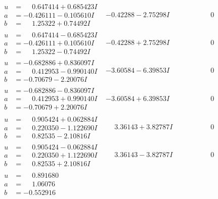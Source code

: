 \documentclass[1p]{elsarticle_modified}
\theoremstyle{definition}
\begin{document}
$$\begin{array}{c|c|c}
\begin{aligned}
u &= \phantom{-}0.647414 + 0.685423 I \\
a &= -0.426111 - 0.105610 I \\
b &= \phantom{-}1.25322 + 0.74492 I\end{aligned}
 & -0.42288 - 2.75298 I & \phantom{-0.000000 } 0 \\ \hline\begin{aligned}
u &= \phantom{-}0.647414 - 0.685423 I \\
a &= -0.426111 + 0.105610 I \\
b &= \phantom{-}1.25322 - 0.74492 I\end{aligned}
 & -0.42288 + 2.75298 I & \phantom{-0.000000 } 0 \\ \hline\begin{aligned}
u &= -0.682886 + 0.836097 I \\
a &= \phantom{-}0.412953 - 0.990140 I \\
b &= -0.70679 - 2.20076 I\end{aligned}
 & -3.60584 - 6.39853 I & \phantom{-0.000000 } 0 \\ \hline\begin{aligned}
u &= -0.682886 - 0.836097 I \\
a &= \phantom{-}0.412953 + 0.990140 I \\
b &= -0.70679 + 2.20076 I\end{aligned}
 & -3.60584 + 6.39853 I & \phantom{-0.000000 } 0 \\ \hline\begin{aligned}
u &= \phantom{-}0.905424 + 0.062884 I \\
a &= \phantom{-}0.220350 - 1.122690 I \\
b &= \phantom{-}0.82535 - 2.10816 I\end{aligned}
 & \phantom{-}3.36143 + 3.82787 I & \phantom{-0.000000 } 0 \\ \hline\begin{aligned}
u &= \phantom{-}0.905424 - 0.062884 I \\
a &= \phantom{-}0.220350 + 1.122690 I \\
b &= \phantom{-}0.82535 + 2.10816 I\end{aligned}
 & \phantom{-}3.36143 - 3.82787 I & \phantom{-0.000000 } 0 \\ \hline\begin{aligned}
u &= \phantom{-}0.891680\phantom{ +0.000000I} \\
a &= \phantom{-}1.06076\phantom{ +0.000000I} \\
b &= -0.552916\phantom{ +0.000000I}\end{aligned}

\end{array}$$
\end{document}
